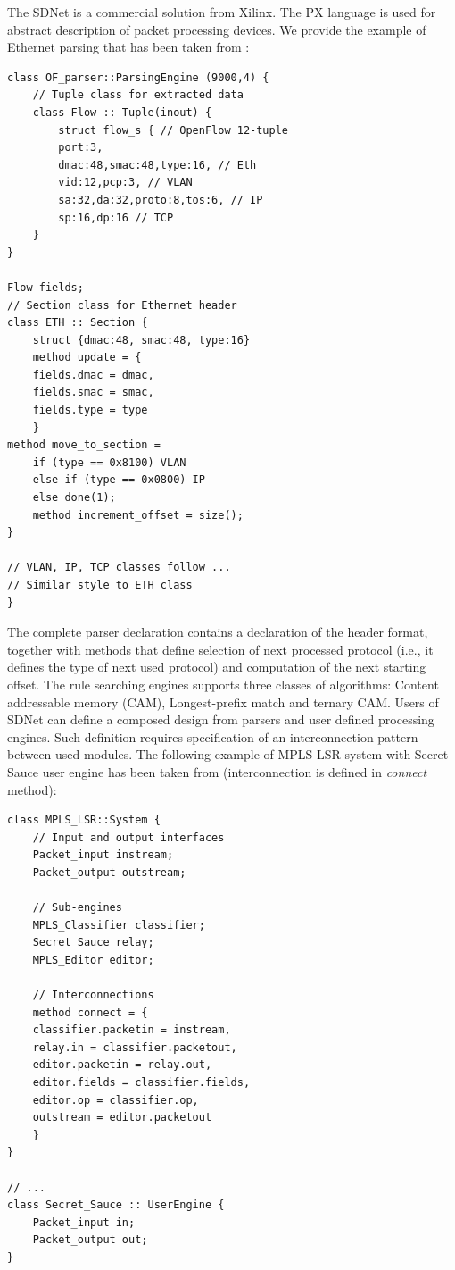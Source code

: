 The SDNet \cite{XilinxSDNet} is a commercial solution from Xilinx. 
The PX language is used for abstract description of packet processing devices. 
We provide the example of Ethernet parsing that has been taken from \cite{XilinxSDNet}:

\begin{Verbatim}[fontsize=\small]
class OF_parser::ParsingEngine (9000,4) {
    // Tuple class for extracted data
    class Flow :: Tuple(inout) {
        struct flow_s { // OpenFlow 12-tuple
        port:3,
        dmac:48,smac:48,type:16, // Eth
        vid:12,pcp:3, // VLAN
        sa:32,da:32,proto:8,tos:6, // IP
        sp:16,dp:16 // TCP
    }
}

Flow fields;
// Section class for Ethernet header
class ETH :: Section {
    struct {dmac:48, smac:48, type:16}
    method update = {
    fields.dmac = dmac,
    fields.smac = smac,
    fields.type = type
    }
method move_to_section =
    if (type == 0x8100) VLAN
    else if (type == 0x0800) IP
    else done(1);
    method increment_offset = size();
}

// VLAN, IP, TCP classes follow ...
// Similar style to ETH class
}
\end{Verbatim}

The complete parser declaration contains a declaration of the header format, together with methods that 
define selection of next processed protocol (i.e., it defines the type of next used protocol) and computation of the next starting offset. 
The rule searching engines supports three classes of algorithms: Content addressable memory (CAM), Longest-prefix match
and ternary CAM.
Users of SDNet can define a composed design from parsers and user defined processing engines. Such definition requires specification
of an interconnection pattern between used modules. 
The following example of MPLS LSR system with Secret Sauce user engine has been taken from 
\cite{XilinxSDNet} (interconnection is defined in \textit{connect} method):

\begin{Verbatim}[fontsize=\small]
class MPLS_LSR::System {
    // Input and output interfaces
    Packet_input instream;
    Packet_output outstream;

    // Sub-engines
    MPLS_Classifier classifier;
    Secret_Sauce relay;
    MPLS_Editor editor;

    // Interconnections
    method connect = {
    classifier.packetin = instream,
    relay.in = classifier.packetout,
    editor.packetin = relay.out,
    editor.fields = classifier.fields,
    editor.op = classifier.op,
    outstream = editor.packetout
    }
}

// ...
class Secret_Sauce :: UserEngine {
    Packet_input in;
    Packet_output out;
}
\end{Verbatim}

